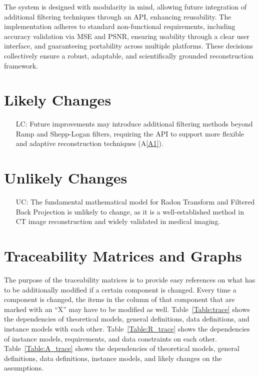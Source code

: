 \documentclass[12pt]{article}
\newcounter{lcnum} %
\newcounter{ucnum} %
\begin{document}
The system is designed with modularity in mind, allowing future integration of
additional filtering techniques through an API, enhancing reusability. The
implementation adheres to standard non-functional requirements, including
accuracy validation via MSE and PSNR, ensuring usability through a clear user
interface, and guaranteeing portability across multiple platforms. These
decisions collectively ensure a robust, adaptable, and scientifically grounded
reconstruction framework.

\section{Likely Changes}

\noindent \begin{itemize}

\item[LC\refstepcounter{lcnum}\thelcnum\label{LC_1}:] Future improvements may
  introduce additional filtering methods beyond Ramp and Shepp-Logan filters,
  requiring the API to support more flexible and adaptive reconstruction
  techniques (A\ref{A1}).

\end{itemize}

\section{Unlikely Changes}

\noindent \begin{itemize}

\item[UC\refstepcounter{ucnum}\theucnum\label{UC_1}:] The fundamental mathematical
  model for Radon Transform and Filtered Back Projection is unlikely to change,
  as it is a well-established method in CT image reconstruction and widely
  validated in medical imaging.
\end{itemize}

\section{Traceability Matrices and Graphs}

The purpose of the traceability matrices is to provide easy references on what
has to be additionally modified if a certain component is changed.  Every time a
component is changed, the items in the column of that component that are marked
with an ``X'' may have to be modified as well.  Table~\ref{Table:trace} shows the
dependencies of theoretical models, general definitions, data definitions, and
instance models with each other. Table~\ref{Table:R_trace} shows the
dependencies of instance models, requirements, and data constraints on each
other. Table~\ref{Table:A_trace} shows the dependencies of theoretical models,
general definitions, data definitions, instance models, and likely changes on
the assumptions.
\end{document}
